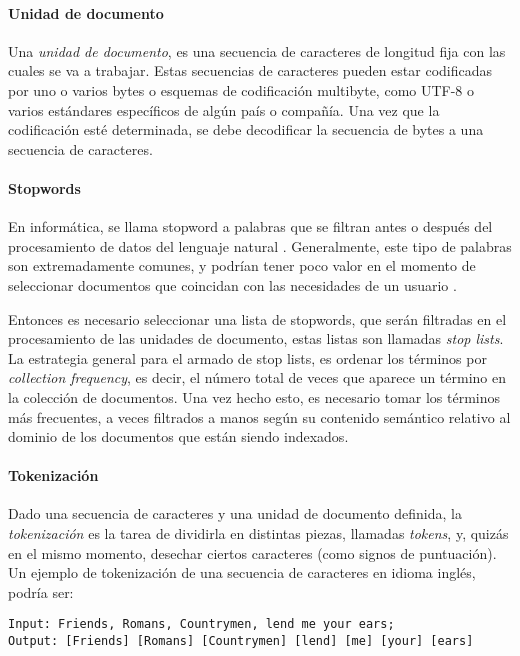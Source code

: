 \paragraph{Unidad de documento}
Una \textit{unidad de documento}, es una secuencia de caracteres de longitud fija con las cuales se va a trabajar. Estas secuencias de caracteres pueden estar codificadas por uno o varios bytes o esquemas de codificación multibyte, como UTF-8 o varios estándares específicos de algún país o compañía. Una vez que la codificación esté determinada, se debe decodificar la secuencia de bytes a una secuencia de caracteres. 

\paragraph{Stopwords}
En informática, se llama stopword a palabras que se filtran antes o después del procesamiento de datos del lenguaje natural \citep{leskovec2014mining}. Generalmente, este tipo de palabras son extremadamente comunes, y podrían tener poco valor en el momento de seleccionar documentos que coincidan con las necesidades de un usuario \citep{schutze2008introduction}.

\bigskip Entonces es necesario seleccionar una lista de stopwords, que serán filtradas en el procesamiento de las unidades de documento, estas listas son llamadas \textit{stop lists}. La estrategia general para el armado de stop lists, es ordenar los términos por \textit{collection frequency}, es decir, el número total de veces que aparece un término en la colección de documentos. Una vez hecho esto, es necesario tomar los términos más frecuentes, a veces filtrados a manos según su contenido semántico relativo al dominio de los documentos que están siendo indexados.

\paragraph{Tokenización}
Dado una secuencia de caracteres y una unidad de documento definida, la \textit{tokenización} es la tarea de dividirla en distintas piezas, llamadas \textit{tokens}, y, quizás en el mismo momento, desechar ciertos caracteres (como signos de puntuación). Un ejemplo de tokenización de una secuencia de caracteres en idioma inglés, podría ser:

\begin{verbatim}
Input: Friends, Romans, Countrymen, lend me your ears;
Output: [Friends] [Romans] [Countrymen] [lend] [me] [your] [ears]
\end{verbatim}

